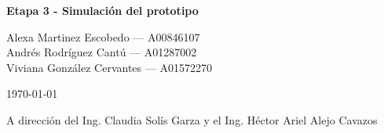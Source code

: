 

\begin{center}
    {\huge \textbf{Etapa 3 - Simulación del prototipo} \par}
    \vspace{1.5cm}
    {\Large
    Alexa Martinez Escobedo — A00846107\\
    Andrés Rodríguez Cantú — A01287002\\
    Viviana González Cervantes — A01572270
    \par}
    \vspace{1cm}
    {\large \today \par}
    A dirección del Ing. Claudia Solís Garza y el Ing. Héctor Ariel Alejo Cavazos
\end{center}

\onehalfspacing
\setlength{\parindent}{0pt}